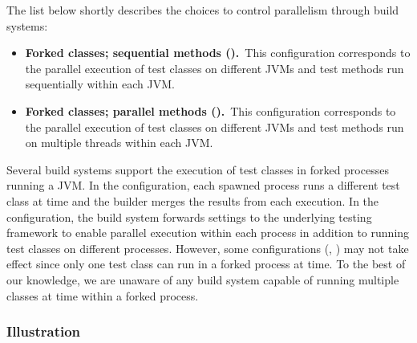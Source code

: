 The list below shortly describes the choices to control parallelism
through build systems:

\begin{itemize}
\item
    \textbf{Forked classes; sequential methods (\ForkSeq).}~This
        configuration corresponds to the parallel execution of test
        classes on different JVMs and test methods run sequentially
        within each JVM.
\item
    \textbf{Forked classes; parallel methods (\ForkParMeth).}~This
        configuration corresponds to the parallel execution of test
        classes on different JVMs and test methods run on multiple
        threads within each JVM.
\end{itemize}

Several build systems support the execution of test classes in forked
processes running a JVM. In the \ForkSeq{} configuration, each spawned
process runs a different test class at time and the builder merges the
results from each execution. In the \ForkParMeth{} configuration, the
build system forwards settings to the underlying testing framework to
enable parallel execution within each process in addition to running
test classes on different processes.  However, some configurations
(\eg, \ParClassSeqMeth) may not take effect since only one test class
can run in a forked process at time.  To the best of our knowledge, we
are unaware of any build system capable of running multiple classes at
time within a forked process.  


\subsubsection*{Illustration}~

